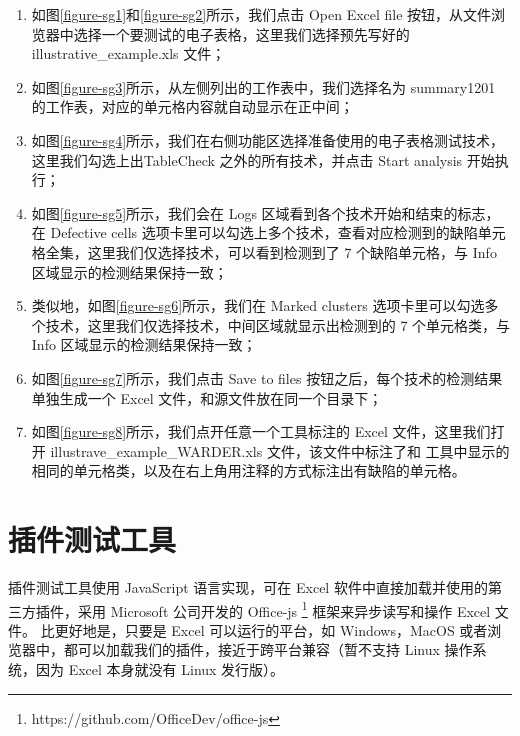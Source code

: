 








\begin{enumerate}
    \item 如图\ref{figure-sg1}和\ref{figure-sg2}所示，我们点击 Open Excel file 按钮，从文件浏览器中选择一个要测试的电子表格，这里我们选择预先写好的 illustrative\_example.xls 文件；
    \item 如图\ref{figure-sg3}所示，从左侧列出的工作表中，我们选择名为 summary1201 的工作表，对应的单元格内容就自动显示在正中间；
    \item 如图\ref{figure-sg4}所示，我们在右侧功能区选择准备使用的电子表格测试技术，这里我们勾选上出TableCheck 之外的所有技术，并点击 Start analysis 开始执行；
    \item 如图\ref{figure-sg5}所示，我们会在 Logs 区域看到各个技术开始和结束的标志，在 Defective cells 选项卡里可以勾选上多个技术，查看对应检测到的缺陷单元格全集，这里我们仅选择\wa 技术，可以看到\wa 检测到了 7 个缺陷单元格，与 Info 区域显示的检测结果保持一致；
    \item 类似地，如图\ref{figure-sg6}所示，我们在 Marked clusters 选项卡里可以勾选多个技术，这里我们仅选择\wa 技术，中间区域就显示出\wa 检测到的 7 个单元格类，与 Info 区域显示的检测结果保持一致；
    \item 如图\ref{figure-sg7}所示，我们点击 Save to files 按钮之后，每个技术的检测结果单独生成一个 Excel 文件，和源文件放在同一个目录下；
    \item 如图\ref{figure-sg8}所示，我们点开任意一个工具标注的 Excel 文件，这里我们打开 illustrave\_example\_WARDER.xls 文件，该文件中标注了和 \sg 工具中显示的相同的单元格类，以及在右上角用注释的方式标注出有缺陷的单元格。
\end{enumerate}


\section{\eg 插件测试工具}

\eg 插件测试工具使用 JavaScript 语言实现，可在 Excel 软件中直接加载并使用的第三方插件，采用 Microsoft 公司开发的 Office-js \footnote{https://github.com/OfficeDev/office-js} 框架来异步读写和操作 Excel 文件。
比\sg 更好地是，只要是 Excel 可以运行的平台，如 Windows，MacOS 或者浏览器中，都可以加载我们的\eg 插件，接近于跨平台兼容（暂不支持 Linux 操作系统，因为 Excel 本身就没有 Linux 发行版）。

